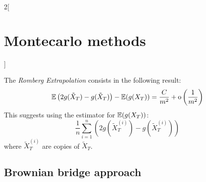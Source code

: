 \documentclass[../../../main_math.tex]{subfiles}
\begin{document}
\begin{multicols}{2}[\section{Montecarlo methods}]
\begin{remark}
  \end{remark}
  \begin{corollary}
    The \emph{Romberg Extrapolation} consists in the following result:
    $$
      \mathbb{E}\left(2g(\tilde{X}_T)-g(\tilde{X}_T)\right)-\mathbb{E}(g(X_T))= \frac{C}{m^2}+\mathrm{o}\left(\frac{1}{m^2}\right)
    $$
    This suggests using the estimator for $\mathbb{E}(g(X_T))$:
    $$
      \frac{1}{n}\sum_{i=1}^n\left(2 g(\tilde{X}_T^{(i)})-g(\tilde{X}_T^{(i)})\right)
    $$
    where $\tilde{X}_T^{(i)}$ are \iid copies of $\tilde{X}_T$.
  \end{corollary}
  \subsection{Brownian bridge approach}
\end{multicols}
\end{document}
